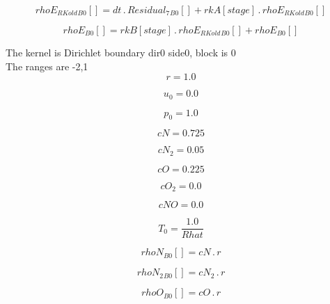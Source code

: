 \documentclass{article}
\begin{document}
\begin{dmath}{rhoE_{RKold}{_{B0}}}[{}] = dt \,.\, {Residual_{7}{_{B0}}}[{}] + {rkA}[{stage}] \,.\, {rhoE_{RKold}{_{B0}}}[{}]\end{dmath}

\begin{dmath}{rhoE{_{B0}}}[{}] = {rkB}[{stage}] \,.\, {rhoE_{RKold}{_{B0}}}[{}] + {rhoE{_{B0}}}[{}]\end{dmath}

\noindent The kernel is Dirichlet boundary dir0 side0, block is 0\\\noindent The ranges are -2,1\\\begin{dmath}r = 1.0\end{dmath}

\begin{dmath}u_{0} = 0.0\end{dmath}

\begin{dmath}p_{0} = 1.0\end{dmath}

\begin{dmath}cN = 0.725\end{dmath}

\begin{dmath}cN_{2} = 0.05\end{dmath}

\begin{dmath}cO = 0.225\end{dmath}

\begin{dmath}cO_{2} = 0.0\end{dmath}

\begin{dmath}cNO = 0.0\end{dmath}

\begin{dmath}T_{0} = \frac{1.0}{Rhat}\end{dmath}

\begin{dmath}{rhoN{_{B0}}}[{}] = cN \,.\, r\end{dmath}

\begin{dmath}{rhoN_{2}{_{B0}}}[{}] = cN_{2} \,.\, r\end{dmath}

\begin{dmath}{rhoO{_{B0}}}[{}] = cO \,.\, r\end{dmath}
\end{document}
